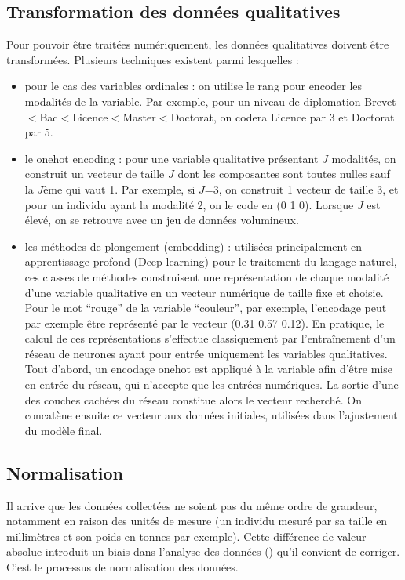 \documentclass[letterpaper,10pt,english]{jupyterBook}
\begin{document}
\subsection{Transformation des données qualitatives}
\label{\detokenize{statsdescriptives:transformation-des-donnees-qualitatives}}
\sphinxAtStartPar
Pour pouvoir être traitées numériquement, les données qualitatives doivent être transformées. Plusieurs techniques existent parmi lesquelles :
\begin{itemize}
\item {} 
\sphinxAtStartPar
pour le cas des variables ordinales : on utilise le rang pour encoder les modalités de la variable. Par exemple, pour un niveau de diplomation Brevet\(<\)Bac\(<\)Licence\(<\)Master\(<\)Doctorat, on codera Licence par 3 et Doctorat par 5.

\item {} 
\sphinxAtStartPar
le one\sphinxhyphen{}hot encoding : pour une variable qualitative présentant \(J\) modalités, on construit un vecteur de taille \(J\) dont les composantes sont toutes nulles sauf la \(J\)\sphinxhyphen{}ème qui vaut 1. Par exemple, si \(J\)=3, on construit 1 vecteur de taille 3, et pour un individu ayant la modalité 2, on le code en (0 1 0). Lorsque \(J\) est élevé, on se retrouve avec un jeu de données volumineux.

\item {} 
\sphinxAtStartPar
les méthodes de plongement (embedding) : utilisées principalement en apprentissage profond (Deep learning) pour le traitement du langage naturel, ces classes de méthodes construisent une représentation de chaque modalité d’une variable qualitative en un vecteur numérique de taille fixe et choisie. Pour le mot “rouge” de la variable “couleur”, par exemple, l’encodage peut par exemple être représenté par le vecteur (0.31 0.57 0.12). En pratique, le calcul de ces représentations s’effectue classiquement par l’entraînement d’un réseau de neurones ayant pour entrée uniquement les variables qualitatives. Tout d’abord, un encodage one\sphinxhyphen{}hot est appliqué à la variable afin d’être mise en entrée du réseau, qui n’accepte que les entrées numériques. La sortie d’une des couches cachées du réseau constitue alors le vecteur recherché. On concatène ensuite ce vecteur aux données initiales, utilisées dans l’ajustement du modèle final.

\end{itemize}


\subsection{Normalisation}
\label{\detokenize{statsdescriptives:normalisation}}
\sphinxAtStartPar
Il arrive que les données collectées ne soient pas du même ordre de grandeur, notamment en raison des unités de mesure (un individu mesuré par sa taille en millimètres et son poids en tonnes par exemple). Cette différence de valeur absolue introduit un biais dans l’analyse des données ({\hyperref[\detokenize{statsdescriptives:biais}]{}}) qu’il convient de corriger. C’est le processus de normalisation des données.
\end{document}
